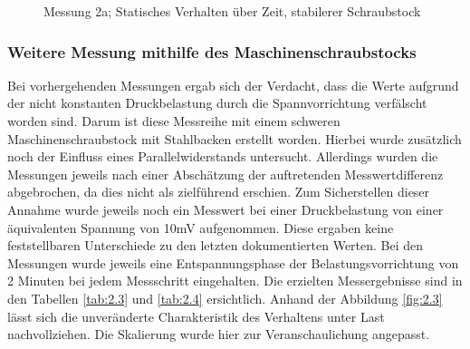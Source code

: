 \documentclass[12pt]{scrreprt} %
\begin{document}
\begin {figure}[htbp]
      \begin{center}
      \end{center}
\caption[Messung 2a;Statisches Verhalten des stabileren Schraubstocks]{Messung 2a; Statisches Verhalten über Zeit, stabilerer Schraubstock}
\label{fig:2.2a}
\end{figure}
\subsubsection{Weitere Messung mithilfe des Maschinenschraubstocks}
Bei vorhergehenden Messungen ergab sich der Verdacht, dass die Werte aufgrund der nicht konstanten Druckbelastung durch die Spannvorrichtung verfälscht worden sind. Darum ist diese Messreihe mit einem schweren Maschinenschraubstock mit Stahlbacken erstellt worden. Hierbei wurde zusätzlich noch der Einfluss eines Parallelwiderstands untersucht. Allerdings wurden die Messungen jeweils nach einer Abschätzung der auftretenden Messwertdifferenz abgebrochen, da dies nicht als zielführend erschien. Zum Sicherstellen dieser Annahme wurde jeweils noch ein Messwert bei einer Druckbelastung von einer äquivalenten Spannung von 10mV aufgenommen. Diese ergaben keine feststellbaren Unterschiede zu den letzten dokumentierten Werten. Bei den Messungen wurde jeweils eine Entspannungsphase der Belastungsvorrichtung von 2 Minuten bei jedem Messschritt eingehalten. Die erzielten Messergebnisse sind in den Tabellen \vref{tab:2.3} und \vref{tab:2.4} ersichtlich. Anhand der Abbildung \vref{fig:2.3} lässt sich die unveränderte Charakteristik des Verhaltens unter Last nachvollziehen. Die Skalierung wurde hier zur Veranschaulichung angepasst. 
\end{document}
